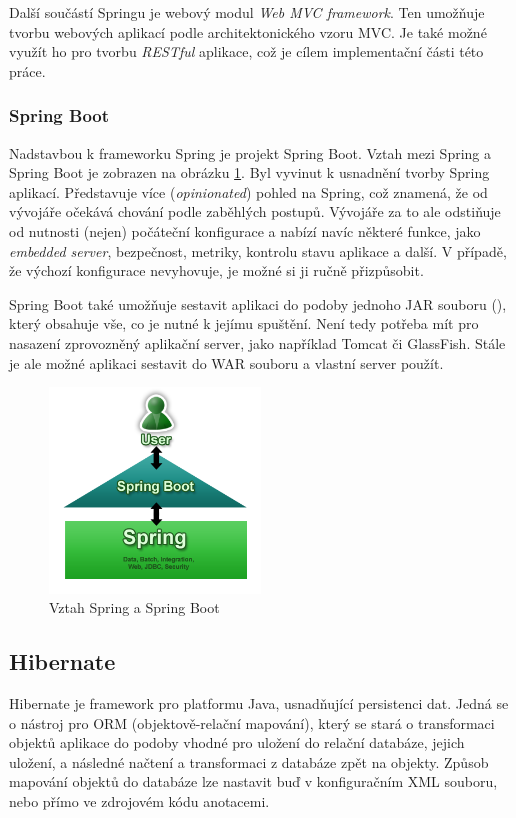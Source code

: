 \documentclass[thesis=B,czech]{FITthesis}[2012/06/26]
\begin{document}
			Další součástí Springu je webový modul \textit{Web MVC framework}. \cite{spring-mvc-framework} Ten umožňuje tvorbu webových aplikací podle architektonického vzoru MVC. Je také možné využít ho pro tvorbu \textit{RESTful} aplikace, což je cílem implementační části této práce.
			
			\subsubsection{Spring Boot}
				Nadstavbou k frameworku Spring je projekt Spring Boot. \cite{spring-boot} Vztah mezi Spring a Spring Boot je zobrazen na obrázku \ref{pic:spring-boot}. Byl vyvinut k usnadnění tvorby Spring aplikací. Představuje více  (\textit{opinionated}) pohled na Spring, což znamená, že od vývojáře očekává  chování podle zaběhlých postupů. \cite{opinionated-software} Vývojáře za to ale odstiňuje od nutnosti (nejen) počáteční konfigurace a nabízí navíc některé funkce, jako \textit{embedded server}, bezpečnost, metriky, kontrolu stavu aplikace a další. V případě, že výchozí konfigurace nevyhovuje, je možné si ji ručně přizpůsobit. \cite{spring-boot-blog}
				
				Spring Boot také umožňuje sestavit aplikaci do podoby jednoho JAR souboru (), který obsahuje vše, co je nutné k jejímu spuštění. Není tedy potřeba mít pro nasazení zprovozněný aplikační server, jako například Tomcat či GlassFish. Stále je ale možné aplikaci sestavit do WAR souboru a vlastní server použít.
				
				\begin{figure}\centering
					\includegraphics[width=0.5\textwidth]{spring-boot.png}
					\caption[Spring Boot]{Vztah Spring a Spring Boot \cite{spring-boot-blog}}
					\label{pic:spring-boot}
				\end{figure}
				
		\subsection{Hibernate}
			Hibernate \cite{hibernate} je framework pro platformu Java, usnadňující persistenci dat. Jedná se o nástroj pro ORM (objektově-relační mapování), který se stará o transformaci objektů aplikace do podoby vhodné pro uložení do relační databáze, jejich uložení, a následné načtení a transformaci z databáze zpět na objekty. Způsob mapování objektů do databáze lze nastavit buď v konfiguračním XML souboru, nebo přímo ve zdrojovém kódu anotacemi.
			
\end{document}
